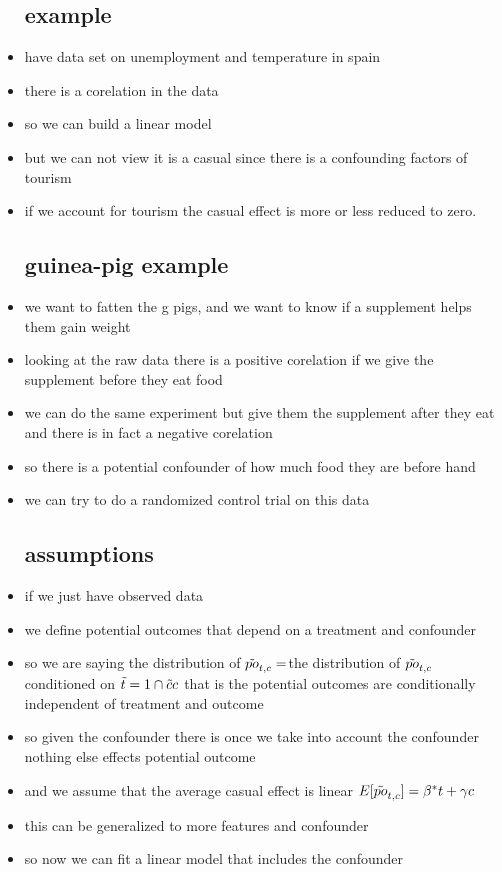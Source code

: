 \documentclass{article}
\begin{document}
\begin{itemize}
\subsection*{example}
\item have data set on unemployment and temperature in spain 
\item there is a corelation in the data 
\item so we can build a linear model 
\item but we can not view it is a casual since there is a confounding factors of tourism
\item if we account for tourism the casual effect is more or less reduced to zero. 
\subsection*{guinea-pig example}
\item we want to fatten the g pigs, and we want to know if a supplement helps them gain weight 
\item looking at the raw data there is a positive corelation if we give the supplement before they eat food
\item we can do the same experiment but give them the supplement after they eat and there is in fact a negative corelation
\item so there is a potential confounder of how much food they are before hand 
\item we can try to do a randomized control trial on this data
\subsection*{assumptions}
\item if we just have observed data 
\item we define potential outcomes that depend on a treatment and confounder 
\item so we are saying the distribution of $\Tilde{po}_{t,c}=$the distribution of $\Tilde{po}_{t,c}$ conditioned on $\Tilde{t}=1 \cap \Tilde{c}c$ 
that is the potential outcomes are conditionally independent of treatment and outcome 
\item so given the confounder there is once we take into account the confounder nothing else effects potential outcome
\item and we assume that the average casual effect is linear $E[\Tilde{po}_{t,c}]=\beta^{*}t+\gamma c$
\item this can be generalized to more features and confounder
\item so now we can fit a linear model  that includes the confounder

\end{itemize}
\end{document}
